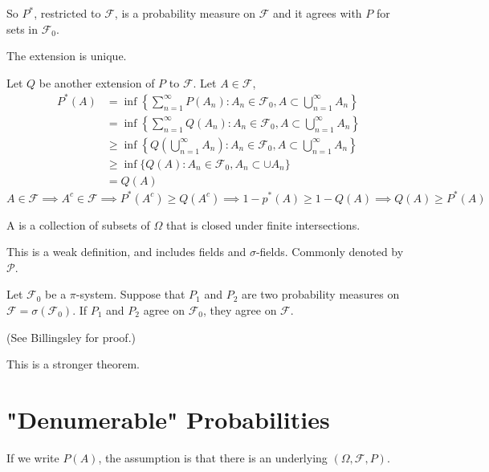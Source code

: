 \documentclass[class=article,crop=false]{standalone}
\begin{document}
So $P^* $, restricted to $ \mathcal{F}$, is a probability measure on $\mathcal{F}$ and it agrees with $P$ for sets in  $\mathcal{F}_0$.
\begin{lem}[]
The extension is unique.
\end{lem}

\begin{prf}
	Let $Q$ be another extension of  $P$ to $\mathcal{F}$. Let $A \in \mathcal{F}$, 
\begin{align*}
	P^* (A) &= \inf{\left\{ \sum_{ n=1}^{\infty} P(A_n): A_n \in \mathcal{F}_0, A \subset  \bigcup_{n= 1}^{\infty} A_n \right\} } \\
		&= \inf{\left\{ \sum_{ n=1}^{\infty} Q(A_n): A_n \in \mathcal{F}_0, A \subset \bigcup_{n= 1}^{\infty} A_n \right\} }  \\
		&\geq \inf{\left\{ Q\left( \bigcup_{n= 1}^{\infty} A_n \right) : A_n \in \mathcal{F}_0, A \subset  \bigcup_{n= 1}^{\infty} A_n \right\} } \\
		&\geq \inf\{Q(A): A_n \in \mathcal{F}_0, A_n \subset \cup A_n\}\\
		&=Q(A)
	\end{align*}
	$A \in \mathcal{F} \implies A^{c} \in \mathcal{F} \implies P^* (A^{c}) \geq Q(A^{c}) \implies 1 - p^* (A) \geq 1-Q(A) \implies Q(A) \geq P^* (A)$ 

\end{prf}

\begin{defn}[pi system]
	A  is a collection of subsets of $\Omega$ that is closed under finite intersections. 
\end{defn}
\begin{note}[]
	This is a weak definition, and includes fields and $\sigma$-fields. Commonly denoted by $\mathcal{P}$.
\end{note}
\begin{thm}[3.3]
	Let $\mathcal{F}_0$ be a $\pi$-system. Suppose that $P_1$ and $P_2$ are two probability measures on $\mathcal{F} = \sigma(\mathcal{F}_0)$. If $P_1$ and $P_2$ agree on $\mathcal{F}_0$, they agree on $\mathcal{F}$.
\end{thm}
(See Billingsley for proof.)
\begin{note}[]
This is a stronger theorem.
\end{note}

\section{"Denumerable" Probabilities}
\begin{note}[]
	If we write $P(A)$, the assumption is that there is an underlying  $(\Omega,\mathcal{F},P)$.
\end{note}
\end{document}
